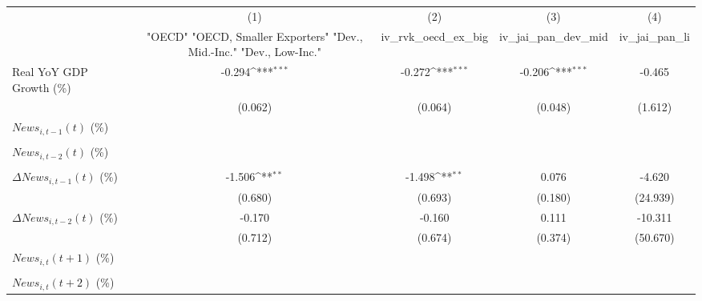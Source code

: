 {
\def\sym#1{\ifmmode^{#1}\else\(^{#1}\)\fi}
\begin{tabular}{l*{4}{c}}
\toprule
                    &\multicolumn{1}{c}{(1)}&\multicolumn{1}{c}{(2)}&\multicolumn{1}{c}{(3)}&\multicolumn{1}{c}{(4)}\\
                    &\multicolumn{1}{c}{ "OECD" "OECD, Smaller Exporters" "Dev., Mid.-Inc." "Dev., Low-Inc."}&\multicolumn{1}{c}{iv_rvk_oecd_ex_big}&\multicolumn{1}{c}{iv_jai_pan_dev_mid}&\multicolumn{1}{c}{iv_jai_pan_li}\\
\midrule
Real YoY GDP Growth (\%)&      -0.294\sym{***}&      -0.272\sym{***}&      -0.206\sym{***}&      -0.465         \\
                    &     (0.062)         &     (0.064)         &     (0.048)         &     (1.612)         \\
\addlinespace
$ News_{i,t-1}(t)$ (\%)&                     &                     &                     &                     \\
                    &                     &                     &                     &                     \\
\addlinespace
$ News_{i,t-2}(t)$ (\%)&                     &                     &                     &                     \\
                    &                     &                     &                     &                     \\
\addlinespace
$ \Delta News_{i,t-1}(t)$ (\%)&      -1.506\sym{**} &      -1.498\sym{**} &       0.076         &      -4.620         \\
                    &     (0.680)         &     (0.693)         &     (0.180)         &    (24.939)         \\
\addlinespace
$ \Delta News_{i,t-2}(t)$ (\%)&      -0.170         &      -0.160         &       0.111         &     -10.311         \\
                    &     (0.712)         &     (0.674)         &     (0.374)         &    (50.670)         \\
\addlinespace
$ News_{i,t}(t+1)$ (\%)&                     &                     &                     &                     \\
                    &                     &                     &                     &                     \\
\addlinespace
$ News_{i,t}(t+2)$ (\%)&                     &                     &                     &                     \\

\end{tabular}}
